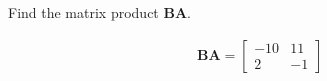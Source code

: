 Find the matrix product $\boldsymbol{BA}$.

\begin{solution}
\begin{align*}
    \boldsymbol{BA} = \begin{bmatrix}
    -10 & 11 \\
    2 & -1
    \end{bmatrix}
\end{align*}
\end{solution}